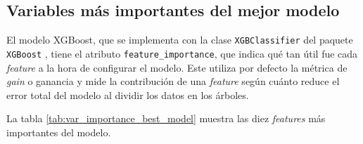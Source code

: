 \subsection{Variables más importantes del mejor modelo}

El modelo XGBoost, que se implementa con la clase \texttt{XGBClassifier} \citep{WEBSITE:xgboost_classifier} del paquete \texttt{XGBoost} \citep{WEBSITE:package_xgboost}, tiene el atributo \texttt{feature\_importance}, que indica qué tan útil fue cada \textit{feature} a la hora de configurar el modelo. Este utiliza por defecto la métrica de \textit{gain} o ganancia \citep{model:xgboost} y mide la contribución de una \textit{feature} según cuánto reduce el error total del modelo al dividir los datos en los árboles.

La tabla \ref{tab:var_importance_best_model} muestra las diez \textit{features} más importantes del modelo.


